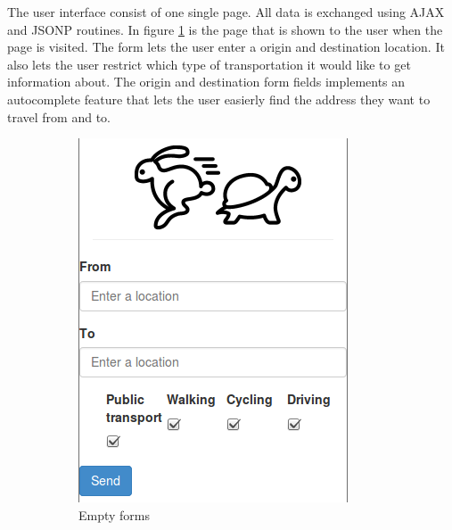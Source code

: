 \documentclass[10pt,a4paper]{article}
\begin{document}
The user interface consist of one single page. All data is exchanged using AJAX and JSONP routines. In figure \ref{fig:ux_empty} is the page that is shown to the user when the page is visited. The form lets the user enter a origin and destination location. It also lets the user restrict which type of transportation it would like to get information about. The origin and destination form fields implements an autocomplete feature that lets the user easierly find the address they want to travel from and to. \\
\begin{figure}[h]
  \centering
  \begin{subfigure}{0.4\textwidth}
    \includegraphics[width=\textwidth]{../ux/empty}
    \caption{Empty forms}
    \label{fig:ux_empty}    
  \end{subfigure}
\hfill %
  \begin{subfigure}{0.4\textwidth}

\end{subfigure}
\end{figure}
\end{document}
